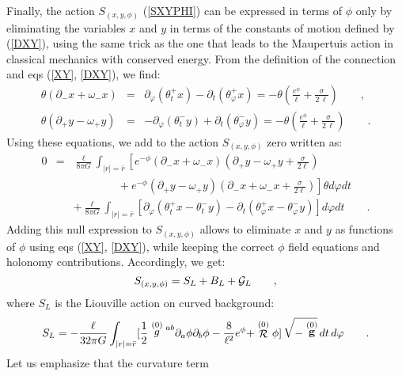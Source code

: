 \documentclass[a4paper,10pt]{article}
\begin{document}
Finally, the action $S_{(x,y,\phi)}$ (\ref{SXYPHI}) can be expressed 
in terms of $\phi$ only by eliminating \cite{HT,CHD} the variables
$x$ and $y$ in terms of the constants
of motion defined by (\ref{DXY}), using the same trick as the one that leads
to the Maupertuis action in classical mechanics with conserved energy.
From the definition of the connection and eqs (\ref{XY}, \ref{DXY}), we find:
\begin{eqnarray}
\theta ( \partial_- x + \omega_- x ) 
&=& \partial_\varphi (\theta ^+_t x) - \partial_t (\theta ^+_\varphi x)
= - \theta ( \frac {e^\phi} \ell + \frac \sigma {2\, \ell})
\qquad ,\nonumber \\
\theta ( \partial_+ y - \omega_+ y ) 
&=& - \partial_\varphi (\theta ^-_t y) + \partial_t (\theta ^-_\varphi y)
= - \theta ( \frac {e^\phi} \ell + \frac \sigma {2\, \ell} )
\qquad .
\end{eqnarray}
Using these equations, we add to the action $S_{(x,y,\phi)}$ zero written as:
\begin{eqnarray}
0 &=&  \frac {\ell}  {8 \pi G}
 \int_{|r|=\bar r } 
\left[e^{-\phi} (\partial_-x + \omega_- x)
           (\partial_+y - \omega_+y +\frac \sigma {2 \ell})\right .
\nonumber \\
&& \left . \qquad \qquad 
+ e^{-\phi} (\partial_+y - \omega_+ y)
          (\partial_-x + \omega_-x +\frac \sigma {2 \ell})\right ] 
\theta d\varphi dt
\nonumber \\ 
&& + \frac {\ell}  {8 \pi G}
 \int_{|r|=\bar r } 
 \left [\partial_\varphi (\theta^+_t x -\theta^-_t y)
  - \partial_t (\theta^+_\varphi x -\theta^-_\varphi y) \right] d\varphi dt
\qquad .
\end{eqnarray}
Adding this null expression to  $S_{(x,y,\phi)}$ allows to eliminate
$x$ and $y$ as functions of $\phi$ using eqs (\ref{XY}, \ref{DXY}),
while keeping the correct $\phi$ field equations and holonomy
contributions. Accordingly, we get:
\begin{equation}
\label{XYL}
S_{(x,y,\phi)} = S_L + {B}_L + {\cal G}_L \qquad ,
\end{equation}
where $S_L$ is the Liouville action on curved background:
\begin{equation}
\label{SL}
S_L= - \frac {\ell} {32 \pi G} \int_{|r|=\bar r} 
[\frac 1 2 \stackrel {(0)} g 
\strut ^{ab}
\partial_a \phi \partial_b \phi - \frac 8 {\ell^2} e^{\phi}+ 
\stackrel {(0)}{\cal R} \phi] 
 \, \sqrt{- \stackrel {(0)} {\bf g}} \, dt \, d\varphi \qquad .
\end{equation}
Let us emphasize that the curvature term
\end{document}
